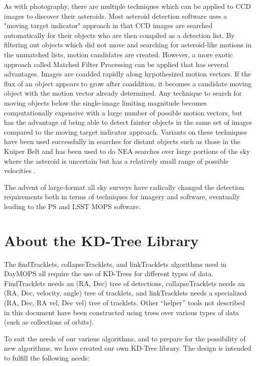 As with photography, there are multiple techniques which can be
applied to CCD images to discover their asteroids.  Most asteroid
detection software uses a "moving target indicator" approach in that
CCD images are searched automatically for their objects who are then
compiled as a detection list.  By filtering out objects which did not
move and searching for asteroid-like motions in the unmatched lists,
motion candidates are created.  However, a more exotic approach called
Matched Filter Processing \citep{2005AJ....130.1951G} can be applied
that has several advantages.  Images are coadded rapidly along
hypothesized motion vectors.  If the flux of an object appears to grow
after coaddition, it becomes a candidate moving object with the motion
vector already determined.  Any technique to search for moving objects
below the single-image limiting magnitude becomes computationally
expensive with a large number of possible motion vectors, but has the
advantage of being able to detect fainter objects in the same set of
images compared to the moving target indicator approach.  Variants on
these techniques have been
used successfully in searches for distant objects such as those in the
Kuiper Belt \citep{BG, MB} and has been used to do NEA searches over
large portions of the sky where the asteroid is uncertain but has a
relatively small range of possible velocities
\citep{2005AJ....130.1951G}.

The advent of large-format all sky surveys have radically changed the
detection requirements both in terms of techniques for imagery and
software, eventually leading to the PS and LSST MOPS software. 



\section{About the KD-Tree Library}
\label{kdTreeLib}

The findTracklets, collapseTracklets, and linkTracklets algorithms
used in DayMOPS all require the use of KD-Trees for different types of
data.  FindTracklets needs an (RA, Dec) tree of detections,
collapseTracklets needs an (RA, Dec, velocity, angle) tree of
tracklets, and linkTracklets needs a specialized (RA, Dec, RA vel,
Dec vel) tree of tracklets.  Other ``helper'' tools not described in
this document have been constructed using trees over various types of
data (such as collections of orbits).

To suit the needs of our various algorithms, and to prepare for the
possibility of new algorithms, we have created our own KD-Tree
library.  The design is intended to fulfill the following needs:

